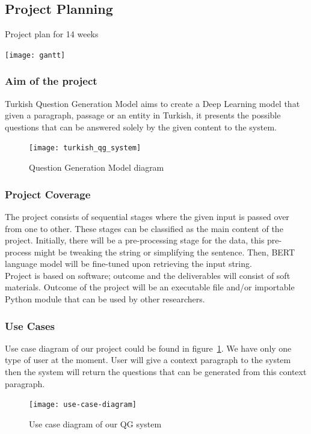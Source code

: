 \documentclass{mefsdp}
\begin{document}
	\subsection{Project Planning}
	\begin{table}[ht!]
		\caption{Project plan for 14 weeks}
		\centering
		\texttt{[image: gantt]}
	\end{table}
	\newpage
	\subsubsection{Aim of the project}
	Turkish Question Generation Model aims to create a Deep Learning model that given a paragraph, passage or an entity in Turkish, it presents the possible questions that can be answered solely by the given content to the system.
	
	\begin{figure}[ht!]
		\centering
		\texttt{[image: turkish\_qg\_system]}
		\caption{Question Generation Model diagram}
	\end{figure}

	\subsubsection{Project Coverage}
	The project consists of sequential stages where the given input is passed over from one to other. These stages can be classified as the main content of the project. Initially, there will be a pre-processing stage for the data, this pre-process might be tweaking the string or simplifying the sentence. Then, BERT language model will be fine-tuned upon retrieving the input string.\\
	
	Project is based on software; outcome and the deliverables will consist of soft materials. Outcome of the project will be an executable file and/or importable Python module that can be used by other researchers.
	
	
	\subsubsection{Use Cases}
	Use case diagram of our project could be found in figure \ref{usecases}. We have only one type of user at the moment. User will give a context paragraph to the system then the system will return the questions that can be generated from this context paragraph.
	\begin{figure}[ht!]
		\centering
		\texttt{[image: use-case-diagram]}
		\caption{Use case diagram of our QG system\label{usecases}}
	\end{figure}
	\newpage
	
\end{document}
